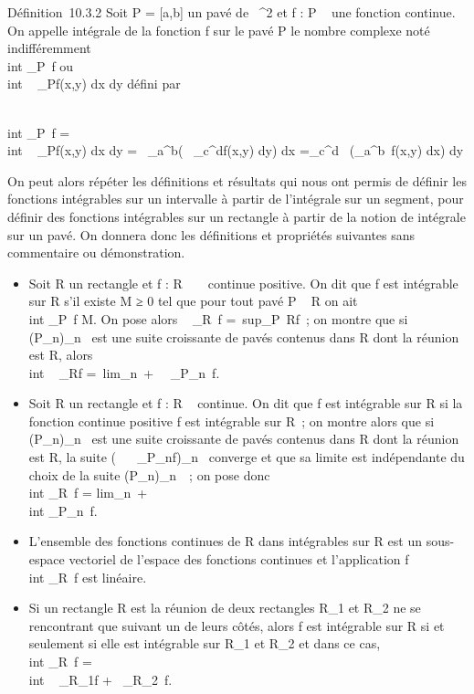 \documentclass[]{article}
\begin{document}
Définition~10.3.2 Soit P = [a,b] \times [c,d] un pavé de
~^2 et f : P \rightarrow~  une fonction continue. On appelle intégrale
de la fonction f sur le pavé P le nombre complexe noté indifféremment
\int  \\int  _P~f
ou \int  \\int ~
_Pf(x,y) dx dy défini par

\int  \\int  _P~f
=\int  \\int ~
_Pf(x,y) dx dy =\int ~
_a^b\left (\int ~
_c^df(x,y) dy\right ) dx
=\int  _c^d~\left
(\int  _a^b~f(x,y)
dx\right ) dy

On peut alors répéter les définitions et résultats qui nous ont permis
de définir les fonctions intégrables sur un intervalle à partir de
l'intégrale sur un segment, pour définir des fonctions intégrables sur
un rectangle à partir de la notion de intégrale sur un pavé. On donnera
donc les définitions et propriétés suivantes sans commentaire ou
démonstration.

\begin{itemize}
\itemsep1pt\parskip0pt
\item
  Soit R un rectangle et f : R \rightarrow~ ~ continue positive. On dit que f est
  intégrable sur R s'il existe M ≥ 0 tel que pour tout pavé P \subset~ R on ait
  \int  \\int  _P~f
  \leq M. On pose alors \int ~
  \int  _R~f =\
  sup_P\subset~Rf~; on montre que si (P_n)_n\in{}~ est
  une suite croissante de pavés contenus dans R dont la réunion est R,
  alors \int  \\int ~
  _Rf =\
  lim_n\rightarrow~+\infty~\int ~
  \int  _P_n~f.
\item
  Soit R un rectangle et f : R \rightarrow~  continue. On dit que f est intégrable
  sur R si la fonction continue positive f est
  intégrable sur R~; on montre alors que si (P_n)_n\in\mathbb{N}~
  est une suite croissante de pavés contenus dans R dont la réunion est
  R, la suite \left (\int ~
  \int ~
  _P_nf\right )_n\in{}~ converge et
  que sa limite est indépendante du choix de la suite
  (P_n)_n\in\mathbb{N}~~; on pose donc \\int
   \int  _R~f
  = lim_n\rightarrow~+\infty~~\\int
   \int  _P_n~f.
\item
  L'ensemble des fonctions continues de R dans  intégrables sur R est
  un sous-espace vectoriel de l'espace des fonctions continues et
  l'application f\mapsto~\\int
   \int  _R~f est linéaire.
\item
  Si un rectangle R est la réunion de deux rectangles R_1 et
  R_2 ne se rencontrant que suivant un de leurs côtés, alors f
  est intégrable sur R si et seulement si elle est intégrable sur
  R_1 et R_2 et dans ce cas, \\int
   \int  _R~f
  =\int  \\int ~
  _R_1f +\int ~
  \int  _R_2~f.
\end{itemize}
\end{document}
